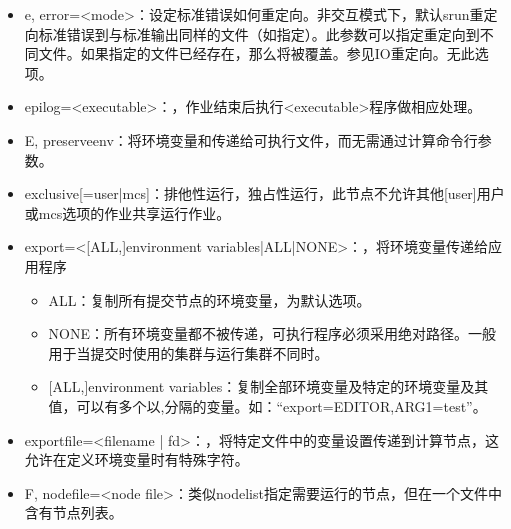 \documentclass[a4paper,12pt,english]{sphinxmanual}
\begin{document}
\begin{itemize}
\item {} 
\sphinxAtStartPar
\sphinxhyphen{}e, \sphinxhyphen{}\sphinxhyphen{}error=<mode>：设定标准错误如何重定向。非交互模式下，默认srun重定向标准错误到与标准输出同样的文件（如指定）。此参数可以指定重定向到不同文件。如果指定的文件已经存在，那么将被覆盖。参见IO重定向。无此选项。

\item {} 
\sphinxAtStartPar
\sphinxhyphen{}\sphinxhyphen{}epilog=<executable>：，作业结束后执行<executable>程序做相应处理。

\item {} 
\sphinxAtStartPar
\sphinxhyphen{}E, \sphinxhyphen{}\sphinxhyphen{}preserve\sphinxhyphen{}env：将环境变量和传递给可执行文件，而无需通过计算命令行参数。

\item {} 
\sphinxAtStartPar
\sphinxhyphen{}\sphinxhyphen{}exclusive{[}=user|mcs{]}：排他性运行，独占性运行，此节点不允许其他{[}user{]}用户或mcs选项的作业共享运行作业。

\item {} 
\sphinxAtStartPar
\sphinxhyphen{}\sphinxhyphen{}export=<{[}ALL,{]}environment variables|ALL|NONE>：，将环境变量传递给应用程序
\begin{itemize}
\item {} 
\sphinxAtStartPar
ALL：复制所有提交节点的环境变量，为默认选项。

\item {} 
\sphinxAtStartPar
NONE：所有环境变量都不被传递，可执行程序必须采用绝对路径。一般用于当提交时使用的集群与运行集群不同时。

\item {} 
\sphinxAtStartPar
{[}ALL,{]}environment variables：复制全部环境变量及特定的环境变量及其值，可以有多个以,分隔的变量。如：“\sphinxhyphen{}\sphinxhyphen{}export=EDITOR,ARG1=test”。

\end{itemize}

\item {} 
\sphinxAtStartPar
\sphinxhyphen{}\sphinxhyphen{}export\sphinxhyphen{}file=<filename | fd>：，将特定文件中的变量设置传递到计算节点，这允许在定义环境变量时有特殊字符。

\item {} 
\sphinxAtStartPar
\sphinxhyphen{}F, \sphinxhyphen{}\sphinxhyphen{}nodefile=<node file>：类似\sphinxhyphen{}\sphinxhyphen{}nodelist指定需要运行的节点，但在一个文件中含有节点列表。


\end{itemize}
\end{document}
